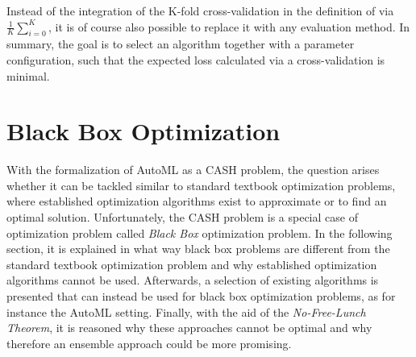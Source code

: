 Instead of the integration of the K-fold cross-validation in the definition of \citeauthor{Thornton-AutoWeka} via $\frac{1}{K} \sum_{i=0}^K$, it is of course also possible to replace it with any evaluation method.\newline
In summary, the goal is to select an algorithm together with a parameter configuration, such that the expected loss calculated via a cross-validation is minimal.

\section{Black Box Optimization}
\label{sec:theory:optimization}
With the formalization of AutoML as a CASH problem, the question arises whether it can be tackled similar to standard textbook optimization problems, where established optimization algorithms exist to approximate or to find an optimal solution.
Unfortunately, the CASH problem is a special case of optimization problem called \textit{Black Box} optimization problem.\newline
In the following section, it is explained in what way black box problems are different from the standard textbook optimization problem and why established optimization algorithms cannot be used.
Afterwards, a selection of existing algorithms is presented that can instead be used for black box optimization problems, as for instance the AutoML setting.
Finally, with the aid of the \textit{No-Free-Lunch Theorem}, it is reasoned why these approaches cannot be optimal and why therefore an ensemble approach could be more promising.

